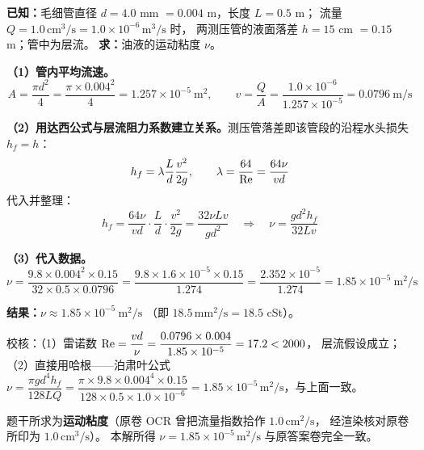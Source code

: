 
\begin{jie}
\textbf{已知：}毛细管直径 $d=4.0$ mm $=0.004$ m，长度 $L=0.5$ m；
流量 $Q=1.0\,\mathrm{cm^{3}/s}=1.0\times10^{-6}\,\mathrm{m^{3}/s}$ 时，
两测压管的液面落差 $h=15$ cm $=0.15$ m；管中为层流。
\textbf{求：}油液的运动粘度 $\nu$。

\textbf{（1）管内平均流速。}
\[
A=\frac{\pi d^{2}}{4}=\frac{\pi\times0.004^{2}}{4}=1.257\times10^{-5}\ \mathrm{m^{2}},
\qquad
v=\frac{Q}{A}=\frac{1.0\times10^{-6}}{1.257\times10^{-5}}=0.0796\ \mathrm{m/s}
\]

\textbf{（2）用达西公式与层流阻力系数建立关系。}测压管落差即该管段的沿程水头损失 $h_f=h$：
\[
h_f=\lambda\frac{L}{d}\frac{v^{2}}{2g},
\qquad
\lambda=\frac{64}{\mathrm{Re}}=\frac{64\nu}{vd}
\]
代入并整理：
\[
h_f=\frac{64\nu}{vd}\cdot\frac{L}{d}\cdot\frac{v^{2}}{2g}
=\frac{32\nu Lv}{gd^{2}}
\quad\Longrightarrow\quad
\nu=\frac{gd^{2}h_f}{32Lv}
\]

\textbf{（3）代入数据。}
\[
\nu=\frac{9.8\times0.004^{2}\times0.15}{32\times0.5\times0.0796}
=\frac{9.8\times1.6\times10^{-5}\times0.15}{1.274}
=\frac{2.352\times10^{-5}}{1.274}=1.85\times10^{-5}\ \mathrm{m^{2}/s}
\]

\textbf{结果：}$\boxed{\nu\approx1.85\times10^{-5}\ \mathrm{m^{2}/s}}$
（即 $18.5\,\mathrm{mm^{2}/s}=18.5$ cSt）。

校核：（1）雷诺数 $\mathrm{Re}=\dfrac{vd}{\nu}=\dfrac{0.0796\times0.004}{1.85\times10^{-5}}=17.2<2000$，
层流假设成立；（2）直接用哈根——泊肃叶公式
$\nu=\dfrac{\pi gd^{4}h_f}{128LQ}
=\dfrac{\pi\times9.8\times0.004^{4}\times0.15}{128\times0.5\times1.0\times10^{-6}}
=1.85\times10^{-5}\,\mathrm{m^{2}/s}$，与上面一致。
\end{jie}

\begin{tishi}
题干所求为\textbf{运动粘度}（原卷 OCR 曾把流量指数拾作 $1.0\,\mathrm{cm^{2}/s}$，
经渲染核对原卷所印为 $1.0\,\mathrm{cm^{3}/s}$）。
本解所得 $\nu=1.85\times10^{-5}\,\mathrm{m^{2}/s}$ 与原答案卷完全一致。
\end{tishi}


